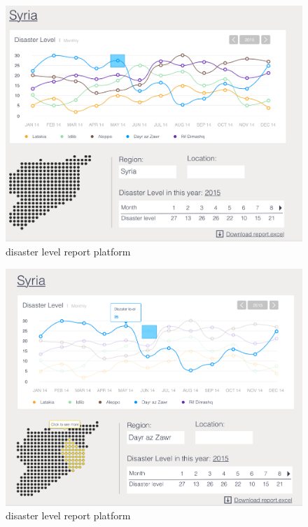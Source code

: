 \noindent\begin{minipage}{.45\textwidth}
\begin{figure}[H]
\centering
\includegraphics[width=\textwidth]{figures/function-stakeholder-1}
\caption{disaster level report platform}
\label{fig:stakeholder1}
\end{figure}
\end{minipage}\hfill
\noindent\begin{minipage}{.45\textwidth}
\begin{figure}[H]
\centering
\includegraphics[width=\textwidth]{figures/function-stakeholder-2}
\caption{disaster level report platform}
\label{fig:stakeholder2}
\end{figure}
\end{minipage}\hfill

